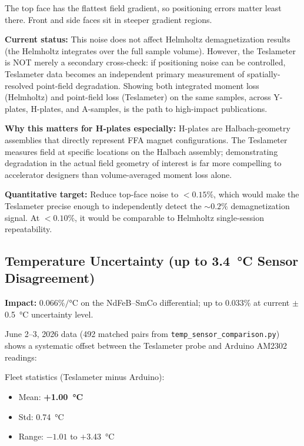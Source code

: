 \documentclass[11pt,letterpaper]{article}
\begin{document}
The top face has the flattest field gradient, so positioning errors matter least
there. Front and side faces sit in steeper gradient regions.

\textbf{Current status:} This noise does not affect Helmholtz demagnetization
results (the Helmholtz integrates over the full sample volume). However, the
Teslameter is NOT merely a secondary cross-check: if positioning noise can be
controlled, Teslameter data becomes an independent primary measurement of
spatially-resolved point-field degradation. Showing both integrated moment loss
(Helmholtz) and point-field loss (Teslameter) on the same samples, across
Y-plates, H-plates, and A-samples, is the path to high-impact publications.

\textbf{Why this matters for H-plates especially:} H-plates are Halbach-geometry
assemblies that directly represent FFA magnet configurations. The Teslameter
measures field at specific locations on the Halbach assembly; demonstrating
degradation in the actual field geometry of interest is far more compelling to
accelerator designers than volume-averaged moment loss alone.

\textbf{Quantitative target:} Reduce top-face noise to $<0.15\%$, which would
make the Teslameter precise enough to independently detect the ${\sim}0.2\%$
demagnetization signal. At $<0.10\%$, it would be comparable to Helmholtz
single-session repeatability.


\subsection{Temperature Uncertainty (up to \SI{3.4}{\degreeCelsius} Sensor Disagreement)}
\label{sec:noise-temp}

\textbf{Impact:} $0.066\%/\si{\degreeCelsius}$ on the NdFeB--SmCo differential;
up to 0.033\% at current $\pm$\SI{0.5}{\degreeCelsius} uncertainty level.

June 2--3, 2026 data (492 matched pairs from
\texttt{temp\_sensor\_comparison.py}) shows a systematic offset between the
Teslameter probe and Arduino AM2302 readings:

Fleet statistics (Teslameter minus Arduino):
\begin{itemize}[nosep]
  \item Mean: \textbf{+\SI{1.00}{\degreeCelsius}}
  \item Std: \SI{0.74}{\degreeCelsius}
  \item Range: $-1.01$ to $+$\SI{3.43}{\degreeCelsius}
\end{itemize}
\end{document}
